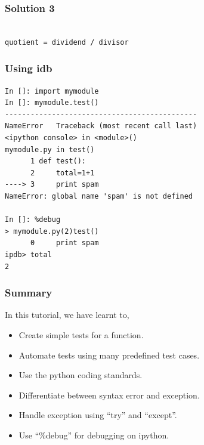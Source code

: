 \documentclass[presentation]{beamer}
\begin{document}
\begin{frame}[fragile]
\frametitle{Solution 3}
\label{sec-14}

\lstset{language=Python}
\begin{lstlisting}

quotient = dividend / divisor
\end{lstlisting}
\end{frame}
\begin{frame}[fragile]
\frametitle{Using idb}
\label{sec-15}

\small
\begin{lstlisting}
In []: import mymodule
In []: mymodule.test()
---------------------------------------------
NameError   Traceback (most recent call last)
<ipython console> in <module>()
mymodule.py in test()
      1 def test():
      2     total=1+1
----> 3     print spam
NameError: global name 'spam' is not defined

In []: %debug
> mymodule.py(2)test()
      0     print spam
ipdb> total
2
\end{lstlisting}
\end{frame}
\begin{frame}
\frametitle{Summary}
\label{sec-16}

 In this tutorial, we have learnt to, 
        

\begin{itemize}
\item Create simple tests for a function.
\item Automate tests using many predefined test cases.
\item Use the python coding standards.
\item Differentiate between syntax error and exception.
\item Handle exception using ``try'' and ``except''.
\item Use ``\%debug'' for debugging on ipython.
\end{itemize}
\end{frame}
\end{document}
